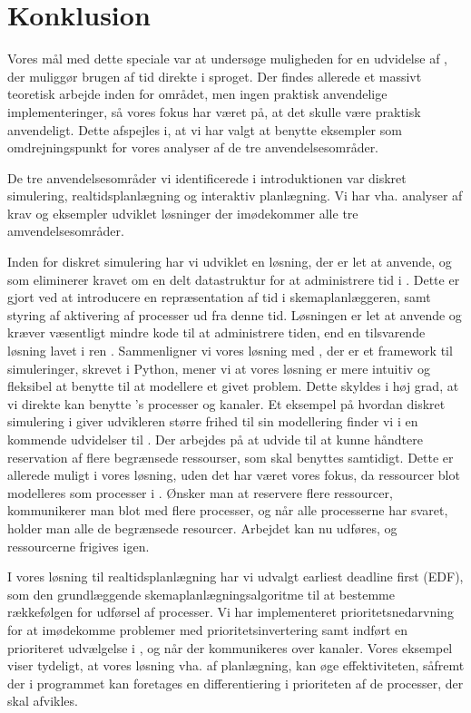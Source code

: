 \chapter{Konklusion} 
\label{chap:konklusion}
\thispagestyle{empty}

Vores mål med dette speciale var at undersøge muligheden for en udvidelse af \pycsp, der muliggør brugen af tid direkte i sproget. Der findes allerede et massivt teoretisk arbejde inden for området, men ingen praktisk anvendelige implementeringer, så vores fokus har været på, at det skulle være praktisk anvendeligt. Dette afspejles i, at vi har valgt at benytte eksempler som omdrejningspunkt for vores analyser af de tre anvendelsesområder. 

De tre anvendelsesområder vi identificerede i introduktionen var diskret simulering, realtidsplanlægning og interaktiv planlægning. Vi har vha. analyser af krav og eksempler udviklet løsninger der imødekommer alle tre amvendelsesområder. 

Inden for diskret simulering har vi udviklet en løsning, der er let at anvende, og som eliminerer kravet om en delt datastruktur for at administrere tid i \pycsp. Dette er gjort ved at introducere en repræsentation af tid i skemaplanlæggeren, samt styring af aktivering af processer ud fra denne tid. Løsningen er let at anvende og kræver væsentligt mindre kode til at administrere tiden, end en tilsvarende løsning lavet i ren \pycsp. 
Sammenligner vi vores løsning med \simpy, der er et framework til simuleringer, skrevet i Python, mener vi at vores løsning er mere intuitiv og fleksibel at benytte til at modellere et givet problem. Dette skyldes i høj grad, at vi direkte kan benytte \pycsp's processer og kanaler. Et eksempel på hvordan diskret simulering i \pycsp giver udvikleren større frihed til sin modellering finder vi i en kommende udvidelser til \simpy. Der arbejdes  på at udvide \simpy til at kunne håndtere reservation af flere begrænsede ressourser, som skal benyttes samtidigt. Dette er allerede muligt i vores løsning, uden det har været vores fokus, da ressourcer blot modelleres som processer i \pycsp. Ønsker man at reservere flere ressourcer, kommunikerer man blot med flere processer, og når alle processerne har svaret, holder man alle de begrænsede resourcer. Arbejdet kan nu udføres, og ressourcerne frigives igen. 

I vores løsning til realtidsplanlægning har vi udvalgt earliest deadline first (EDF), som den grundlæggende skemaplanlægningsalgoritme til at bestemme rækkefølgen for udførsel af processer. Vi har implementeret prioritetsnedarvning for at imødekomme problemer med prioritetsinvertering samt indført en prioriteret udvælgelse i , og når der kommunikeres over kanaler. Vores eksempel viser tydeligt, at vores løsning vha. af planlægning, kan øge effektiviteten, såfremt der i programmet kan foretages en differentiering i prioriteten af de processer, der skal afvikles. 

